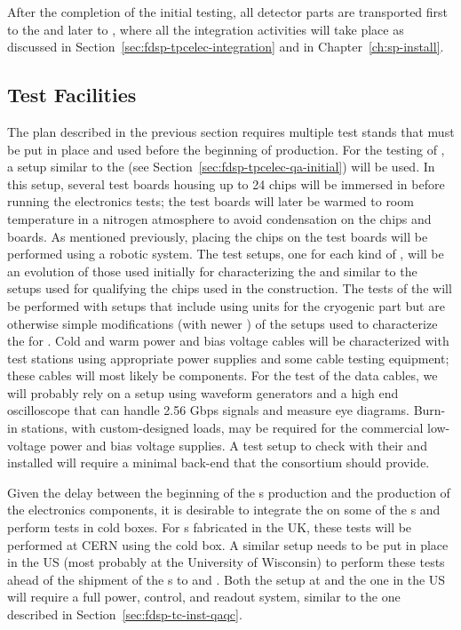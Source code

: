 After the completion of the initial  testing, all detector 
parts are transported first to the  and later to , 
where all the integration activities will take place as discussed in
Section~\ref{sec:fdsp-tpcelec-integration} and in Chapter~\ref{ch:sp-install}.

\subsection{Test Facilities}
\label{sec:fdsp-tpcelec-production-facilities}

The  plan described in the previous section requires
multiple test stands that must be put in place and used 
before the beginning of production. For the testing of ,
a setup similar to the  (see
Section~\ref{sec:fdsp-tpcelec-qa-initial}) will
be used. In this setup, several test boards housing up to 24
chips will be immersed in \lntwo before running the
electronics tests; the test boards will later be warmed to room temperature in 
a nitrogen atmosphere to avoid condensation on the chips and
boards. As mentioned previously, placing the chips on the test 
boards will be performed using a robotic system. The test setups,
one for each kind of , will be an evolution of those
used initially for characterizing the  and similar
to the setups used for qualifying the chips used in the 
construction. The tests of the  will be performed with
setups that include using  units for the cryogenic part
but are otherwise simple modifications (with newer )
of the setups used to characterize the 
for . Cold and warm power and bias voltage cables will
be characterized with test stations using appropriate
power supplies and some cable testing equipment; these cables will most
likely be  components.
For the test of the data cables, we will probably rely on a setup
using waveform generators and a high end oscilloscope that 
can handle 2.56 Gbps signals and measure eye diagrams. 
Burn-in stations, with custom-designed loads, may be required for 
the commercial low-voltage power and bias voltage supplies.
A test setup to check  with their 
and  installed will require a minimal  back-end that the
 consortium should provide.

Given the delay between the beginning of the  
s production and the production of the  electronics components,
it is desirable to integrate the  on some of the s 
and perform tests in cold boxes. For s fabricated in the UK,
these tests will be performed at CERN using the  cold box.
A similar setup needs to be put in place in the US (most probably at 
the University of Wisconsin) to perform these tests ahead of the shipment of the s to 
 and . Both the setup at  and
the one in the US will require a full power, control, and readout system, similar
to the one described in Section~\ref{sec:fdsp-tc-inst-qaqc}.
